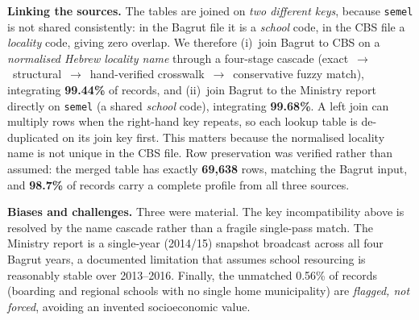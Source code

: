\textbf{Linking the sources.} The tables are joined on \emph{two different keys},
because \texttt{semel} is not shared consistently: in the Bagrut file it is a
\emph{school} code, in the CBS file a \emph{locality} code, giving zero overlap.
We therefore (i)~join Bagrut to CBS on a \emph{normalised Hebrew locality name}
through a four-stage cascade
(exact~$\rightarrow$~structural~$\rightarrow$~hand-verified crosswalk~$\rightarrow$~conservative
fuzzy match), integrating \textbf{99.44\%} of records, and (ii)~join Bagrut to
the Ministry report directly on \texttt{semel} (a shared \emph{school} code),
integrating \textbf{99.68\%}. A left join can multiply rows when the right-hand
key repeats, so each lookup table is de-duplicated on its join key first. This
matters because the normalised locality name is not unique in the CBS file. Row
preservation was verified rather than assumed: the merged table has exactly
\textbf{69,638} rows, matching the Bagrut input, and \textbf{98.7\%} of records
carry a complete profile from all three sources.

\textbf{Biases and challenges.} Three were material. The key incompatibility
above is resolved by the name cascade rather than a fragile single-pass match.
The Ministry report is a single-year (2014/15) snapshot broadcast across all four
Bagrut years, a documented limitation that assumes school resourcing is
reasonably stable over 2013--2016. Finally, the unmatched 0.56\% of records
(boarding and regional schools with no single home municipality) are
\emph{flagged, not forced}, avoiding an invented socioeconomic value.
